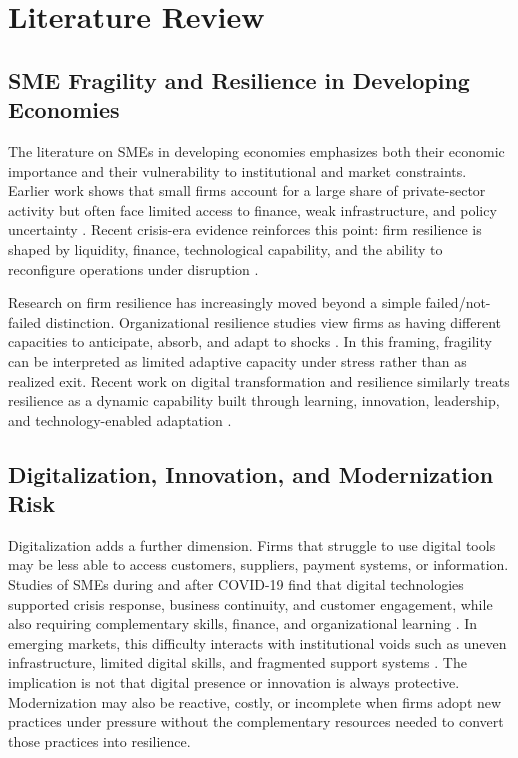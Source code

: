 \section{Literature Review}

\subsection{SME Fragility and Resilience in Developing Economies}

The literature on SMEs in developing economies emphasizes both their economic importance and their vulnerability to institutional and market constraints. Earlier work shows that small firms account for a large share of private-sector activity but often face limited access to finance, weak infrastructure, and policy uncertainty \citep{beck2006small, ayyagari2007small}. Recent crisis-era evidence reinforces this point: firm resilience is shaped by liquidity, finance, technological capability, and the ability to reconfigure operations under disruption \citep{papadopoulos2020digital, guo2020digitalization, mishrif2023technology, amadasun2022finance}.

Research on firm resilience has increasingly moved beyond a simple failed/not-failed distinction. Organizational resilience studies view firms as having different capacities to anticipate, absorb, and adapt to shocks \citep{lengnickhall2005adaptive, duchek2020organizational}. In this framing, fragility can be interpreted as limited adaptive capacity under stress rather than as realized exit. Recent work on digital transformation and resilience similarly treats resilience as a dynamic capability built through learning, innovation, leadership, and technology-enabled adaptation \citep{awad2024digital, sagala2024toward, sagala2024antifragility, martinrojas2026resilience}.

\subsection{Digitalization, Innovation, and Modernization Risk}

Digitalization adds a further dimension. Firms that struggle to use digital tools may be less able to access customers, suppliers, payment systems, or information. Studies of SMEs during and after COVID-19 find that digital technologies supported crisis response, business continuity, and customer engagement, while also requiring complementary skills, finance, and organizational learning \citep{papadopoulos2020digital, guo2020digitalization, mishrif2023technology, awad2024digital, robertson2022digitalmaturity, lestari2024business, sinha2025digitalisation}. In emerging markets, this difficulty interacts with institutional voids such as uneven infrastructure, limited digital skills, and fragmented support systems \citep{khanna1997why}. The implication is not that digital presence or innovation is always protective. Modernization may also be reactive, costly, or incomplete when firms adopt new practices under pressure without the complementary resources needed to convert those practices into resilience.

